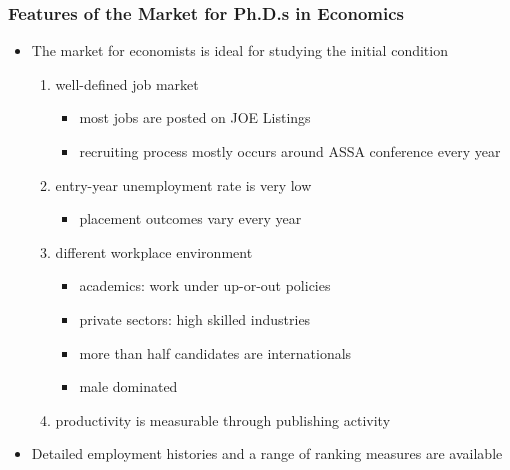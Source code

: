 \documentclass[10pt,svgnames,fragile]{beamer}
\begin{document}
\begin{frame}
	\frametitle{Features of the Market for Ph.D.s in Economics}
	\begin{itemize}
			\item The market for economists is ideal for studying the initial condition
	\vspace{2 mm}
			\begin{enumerate}
				\item well-defined job market
				\begin{itemize}
						\vspace{1 mm}
					\item most jobs are posted on JOE Listings
						\vspace{1 mm}
					\item recruiting process mostly occurs around ASSA conference every year 
				\end{itemize}
	\vspace{1 mm}
				\item entry-year unemployment rate is very low
				\begin{itemize}
						\vspace{1 mm}
					\item placement outcomes vary every year
				\end{itemize}
		\vspace{1 mm}
				\item different workplace environment
					\vspace{1 mm}
				\begin{itemize}
				\item academics: work under up-or-out policies
					\vspace{1 mm}
				\item private sectors:  high skilled industries
					\vspace{1 mm}
				\item more than half candidates are internationals 
					\vspace{1 mm}
				\item male dominated
				\end{itemize}
			\vspace{1 mm}
				\item productivity is measurable through publishing activity
			\end{enumerate}
\vfill
			\item Detailed employment histories and a range of ranking measures are available	
\vfill
	\end{itemize}
\end{frame}
\end{document}
